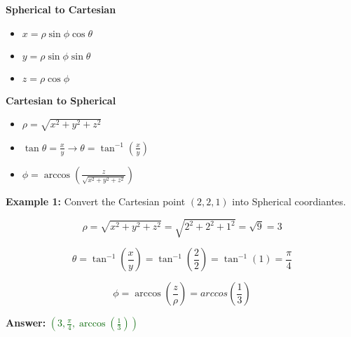 \documentclass[10pt]{article}                               %
\begin{document}
\begin{adjustwidth}{2em}{0pt}
\begin{adjustwidth}{2em}{0pt}
\begin{notebox}
        \end{notebox}

        \vspace{0.5em}

        \textbf{Spherical to Cartesian}

            \begin{itemize}
                \item \( x = \rho\sin\phi\cos\theta \)
                \item \( y = \rho\sin\phi\sin\theta \)
                \item \( z = \rho\cos\phi \)
            \end{itemize}

            \vspace{0.5em}

            \textbf{Cartesian to Spherical}

            \begin{itemize}
                \item \( \rho = \sqrt{x^2 + y^2 + z^2} \)
                \item \( \tan\theta = \frac{x}{y}  \rightarrow  \theta = \tan^{-1}\left(\frac{x}{y}\right) \)
                \item \( \phi = \arccos\left(\frac{z}{\sqrt{x^2 + y^2 + z^2}}\right) \)
            \end{itemize}

            \begin{examplebox}
        
                \textbf{Example 1:} Convert the Cartesian point \( \left(2,2,1\right) \) into Spherical coordiantes.
                \vspace{0.5em}

                \begin{adjustwidth}{2em}{0pt}

                    \[ \rho = \sqrt{x^2 + y^2 + z^2} = \sqrt{2^2 + 2^2 + 1^2} = \sqrt{9} = 3 \]

                    \[ \theta = \tan^{-1}\left(\frac{x}{y}\right) = \tan^{-1}\left(\frac{2}{2}\right) = \tan^{-1}(1) = \frac{\pi}{4} \]

                    \[ \phi = \arccos\left(\frac{z}{\rho}\right) = arccos\left(\frac{1}{3}\right) \]

                    \textbf{Answer:} \textcolor{darkgreen}{\( \left(3, \frac{\pi}{4}, \arccos\left(\frac{1}{3}\right)\right) \)}


\end{adjustwidth}
\end{examplebox}
\end{adjustwidth}
\end{adjustwidth}
\end{document}
